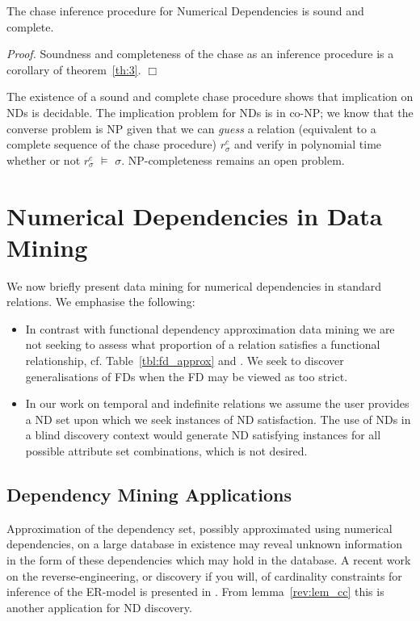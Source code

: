 \begin{corollary}\label{th:3}
\begin{rm}
The chase inference procedure for Numerical Dependencies is sound and
complete.
\end{rm}
\end{corollary}

{\em Proof.} Soundness and completeness of the chase as an inference
procedure is a corollary of theorem~\ref{th:3}. $\Box$

\smallskip
The existence of a sound and complete chase procedure shows that
implication on NDs is decidable. The implication
problem for NDs is in co-NP; we know that the converse
problem is NP given that we can {\em guess} a relation  (equivalent to
a complete sequence of the chase procedure) 
$r_\sigma^c$ 
and verify in polynomial time whether or not
$r_\sigma^c$ $\models$ $\sigma$. NP-completeness remains an open problem.


\section{Numerical Dependencies in Data Mining}\label{sec:nd_datamine}
We now briefly present data mining for numerical dependencies in
standard relations. We emphasise the following:
\begin{itemize}
\item In contrast with functional dependency approximation data mining
we are not seeking to assess what proportion of a relation satisfies a
functional relationship, cf. Table~\ref{tbl:fd_approx} and
\cite{hkp98,km95}. We seek to discover 
generalisations of FDs when the FD may be viewed as too strict.
\item In our work on temporal and indefinite relations we assume the
user provides a ND set upon which we seek instances of ND
satisfaction. The use of NDs in a blind discovery context would
generate ND satisfying instances for all possible attribute set
combinations, which is not desired.
\end{itemize}

\subsection{Dependency Mining Applications}\label{subsec:fd_jobs}
Approximation of the dependency set, possibly approximated using numerical
dependencies, on a large database in existence may reveal unknown information
in the form of these dependencies which may hold in the database. A
recent work on the reverse-engineering, or discovery if you will, of
cardinality constraints for inference of the ER-model is presented in
\cite{sou98}. From lemma~\ref{rev:lem_cc} this is another application
for ND discovery.

